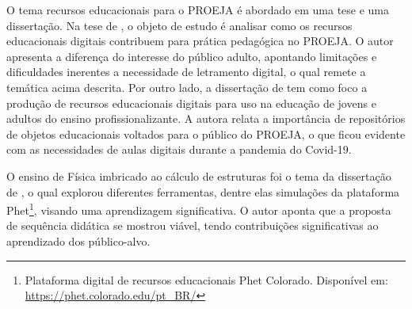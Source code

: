 O tema recursos educacionais para o PROEJA é abordado em uma tese e uma
dissertação. Na tese de \textcite[268f]{Bentes103}, o objeto de estudo é analisar
como os recursos educacionais digitais contribuem para prática
pedagógica no PROEJA. O autor apresenta a diferença do interesse do
público adulto, apontando limitações e dificuldades inerentes a
necessidade de letramento digital, o qual remete a temática acima
descrita. Por outro lado, a dissertação de \textcite{Souza2021} tem como foco a
produção de recursos educacionais digitais para uso na educação de
jovens e adultos do ensino profissionalizante. A autora relata a
importância de repositórios de objetos educacionais voltados para o
público do PROEJA, o que ficou evidente com as necessidades de aulas
digitais durante a pandemia do Covid-19.

O ensino de Física imbricado ao cálculo de estruturas foi o tema da
dissertação de \textcite[147~f.,~il]{Lima2022}, o qual explorou diferentes ferramentas,
dentre elas simulações da plataforma Phet\footnote{Plataforma digital de
	recursos educacionais Phet Colorado. Disponível em:
	\url{https://phet.colorado.edu/pt_BR/}}, visando uma aprendizagem
significativa. O autor aponta que a proposta de sequência didática se
mostrou viável, tendo contribuições significativas ao aprendizado dos
público-alvo.
